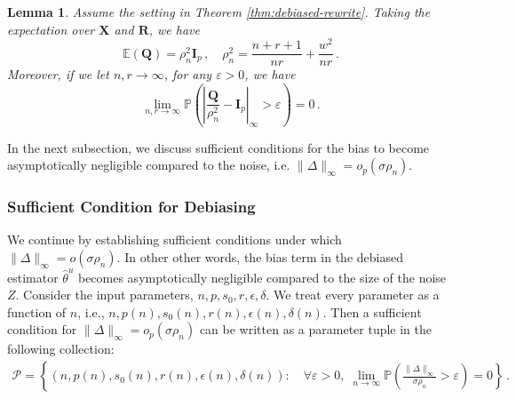 \documentclass[11pt]{article}
\newtheorem{lemma}{Lemma}%
\newcommand{\bX}{\boldsymbol{X}}
\newcommand{\bI}{\boldsymbol{I}}
\newcommand{\bR}{\boldsymbol{R}}
\newcommand{\bQ}{\boldsymbol{Q}}
\newcommand{\Expected}{\mathbb{E}}
\newcommand{\Prob}{\mathbb{P}}
\newcommand{\hth}{\widehat{\theta}}
\begin{document}
\begin{lemma}\label{lem:rho_n}
    Assume the setting in Theorem \ref{thm:debiased-rewrite}. Taking the expectation over $\bX$ and $\bR$, we have
    \begin{equation}\label{eq:rho_n}
        \Expected\left(\bQ\right)  = \rho_n^2\bI_p\,,\quad\rho_n^2 = \frac{n+r+1}{n r}+\frac{w^2}{nr}\,.
    \end{equation}
    Moreover, if we let $n,r\to\infty$, for any $\varepsilon>0$, we have
    \[
    \lim_{n,r\to\infty}\Prob\left(\left|\frac{\bQ}{\rho_n^2}-\bI_p\right|_{\infty}>\varepsilon\right)=0\,.
    \]
\end{lemma} 
In the next subsection, we discuss sufficient conditions for the bias to become asymptotically negligible compared to the noise, i.e. $\|\Delta\|_\infty = o_p(\sigma\rho_n)$.

\subsubsection{Sufficient Condition for Debiasing}
We continue by establishing sufficient conditions under which $\|\Delta\|_\infty=o(\sigma\rho_n)$. In other other words, the bias term in the debiased estimator $\hth^u$ becomes asymptotically negligible compared to the size of the noise $Z$. 
Consider the input parameters, $n,p,s_0,r,\epsilon,\delta$.  We treat every parameter as a function of $n$, i.e., $n,p(n),s_0(n),r(n),\epsilon(n),\delta(n)$. Then a sufficient condition for $\|\Delta\|_\infty=o_p(\sigma\rho_n)$ can be written as a parameter tuple in the following collection:
\begin{align}\label{eq:op}
\mathcal{P} = \left\{(n,p(n),s_0(n),r(n),\epsilon(n),\delta(n)):\quad \forall \varepsilon>0, \; \lim_{n\to\infty}\Prob\left(\frac{\|\Delta\|_\infty}{\sigma\rho_n}>\varepsilon \right) = 0\right\}\,.
\end{align}
\end{document}
